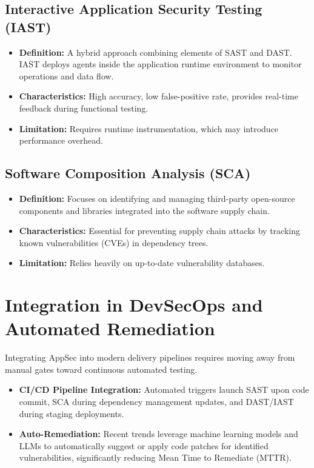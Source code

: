 \documentclass[11pt,a4paper]{article}
\begin{document}
\subsection{Interactive Application Security Testing (IAST)}
\begin{itemize}
    \item \textbf{Definition:} A hybrid approach combining elements of SAST and DAST. IAST deploys agents inside the application runtime environment to monitor operations and data flow.
    \item \textbf{Characteristics:} High accuracy, low false-positive rate, provides real-time feedback during functional testing.
    \item \textbf{Limitation:} Requires runtime instrumentation, which may introduce performance overhead.
\end{itemize}

\subsection{Software Composition Analysis (SCA)}
\begin{itemize}
    \item \textbf{Definition:} Focuses on identifying and managing third-party open-source components and libraries integrated into the software supply chain.
    \item \textbf{Characteristics:} Essential for preventing supply chain attacks by tracking known vulnerabilities (CVEs) in dependency trees.
    \item \textbf{Limitation:} Relies heavily on up-to-date vulnerability databases.
\end{itemize}

\section{Integration in DevSecOps and Automated Remediation}
Integrating AppSec into modern delivery pipelines requires moving away from manual gates toward continuous automated testing.
\begin{itemize}
    \item \textbf{CI/CD Pipeline Integration:} Automated triggers launch SAST upon code commit, SCA during dependency management updates, and DAST/IAST during staging deployments.
    \item \textbf{Auto-Remediation:} Recent trends leverage machine learning models and LLMs to automatically suggest or apply code patches for identified vulnerabilities, significantly reducing Mean Time to Remediate (MTTR).
\end{itemize}
\end{document}
